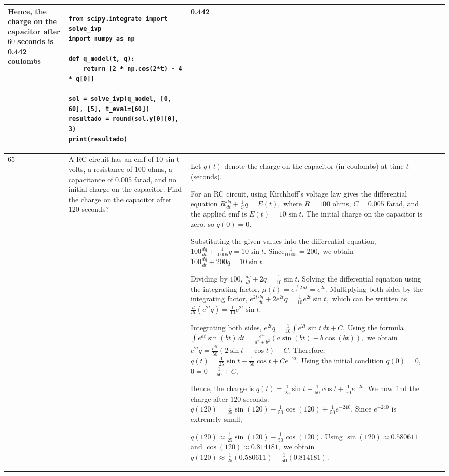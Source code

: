 \documentclass[a4paper,12pt]{article}
\begin{document}
\begin{longtable}{|p{0.3cm}|p{}|p{10cm}|p{}|p{1.5cm}|}
Hence, the charge on the capacitor after $60$ seconds is 0.442 coulombs

& \begin{verbatim}
from scipy.integrate import solve_ivp
import numpy as np

def q_model(t, q):
    return [2 * np.cos(2*t) - 4 * q[0]]

sol = solve_ivp(q_model, [0, 60], [5], t_eval=[60])
resultado = round(sol.y[0][0], 3)
print(resultado)
\end{verbatim}& 0.442 \\ \hline 
 65           & A RC circuit has an emf of 10 sin t volts, a resistance of 100 ohms, a capacitance of 0.005 farad, and no initial charge on the capacitor. Find the charge on the capacitor after 120 seconds?


              &Let $q(t)$ denote the charge on the capacitor (in coulombs) at time $t$ (seconds).

For an RC circuit, using Kirchhoff's voltage law gives the differential equation
$R\frac{dq}{dt}+\frac{1}{C}q=E(t),$
where $R=100$ ohms, $C=0.005$ farad, and the applied emf is
$E(t)=10\sin t.$
The initial charge on the capacitor is zero, so $q(0)=0.$

Substituting the given values into the differential equation,
$100\frac{dq}{dt}+\frac{1}{0.005}q=10\sin t.$
Since$\frac{1}{0.005}=200,$ we obtain $100\frac{dq}{dt}+200q=10\sin t.$

Dividing by $100$, $\frac{dq}{dt}+2q=\frac{1}{10}\sin t.$
Solving the differential equation using the integrating factor,
$\mu(t)=e^{\int2\,dt}=e^{2t}.$
Multiplying both sides by the integrating factor,
$e^{2t}\frac{dq}{dt}+2e^{2t}q
=\frac{1}{10}e^{2t}\sin t,$
which can be written as $\frac{d}{dt}\left(e^{2t}q\right)
=\frac{1}{10}e^{2t}\sin t.$

Integrating both sides,
$e^{2t}q
=\frac{1}{10}\int e^{2t}\sin t\,dt+C.$ Using the formula $\int e^{at}\sin(bt)\,dt
=\frac{e^{at}}{a^2+b^2}
\left(a\sin(bt)-b\cos(bt)\right),$
we obtain $e^{2t}q
=\frac{e^{2t}}{50}\left(2\sin t-\cos t\right)+C.$
Therefore, $q(t)=\frac{1}{25}\sin t-\frac{1}{50}\cos t+Ce^{-2t}.$
Using the initial condition $q(0)=0$,
$0 =0-\frac{1}{50}+C,$

Hence, the charge is
$q(t)=\frac{1}{25}\sin t-\frac{1}{50}\cos t+\frac{1}{50}e^{-2t}.$
We now find the charge after $120$ seconds: $q(120)=\frac{1}{25}\sin(120)-\frac{1}{50}\cos(120)+\frac{1}{50}e^{-240}.$ Since $e^{-240}$ is extremely small,

$q(120)\approx\frac{1}{25}\sin(120)-\frac{1}{50}\cos(120).$
Using $\sin(120)\approx0.580611$
and $\cos(120)\approx0.814181,$
we obtain $q(120)\approx\frac{1}{25}(0.580611)
-\frac{1}{50}(0.814181).$


\end{longtable}
\end{document}

